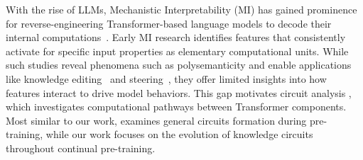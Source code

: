 With the rise of LLMs, Mechanistic Interpretability (MI) has gained prominence for reverse-engineering Transformer-based language models to decode their internal computations~\citep{mi_review,mi_primer,mi_safety_review,singh2024rethinking,sharkey2025open}.
Early MI research identifies features that consistently activate for specific input properties as elementary computational units.
While such studies reveal phenomena such as polysemanticity and enable applications like knowledge editing~\citep{editing_survey,know_edit,DBLP:journals/corr/abs-2406-19354} and steering~\citep{turner2023activation}, they offer limited insights into how features interact to drive model behaviors.
This gap motivates circuit analysis \citep{transformer_circuits,knowledge_circuits}, which investigates computational pathways between Transformer components. 
Most similar to our work, \citet{circuits_are_consistent} examines general circuits formation during pre-training, while our work focuses on the evolution of knowledge circuits throughout continual pre-training.
